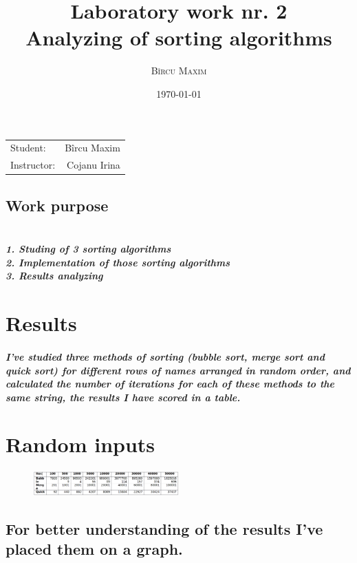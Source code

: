 \documentclass[12pt]{article}
\title{Laboratory work nr. 2  \\Analyzing of sorting algorithms\\ } %
\author{\textsc{Bîrcu} \textsc{Maxim}} %
\date{\today} %
\begin{document}
\maketitle %

\begin{center}
\begin{tabular}{l r}

Student: & Bîrcu Maxim \\ %
Instructor: & Cojanu Irina %

\end{tabular}
\end{center}


\subsection*{Work purpose}
\subparagraph*{
\\1. Studing of 3 sorting algorithms \\
2. Implementation of those sorting algorithms\\
3. Results analyzing }

\newpage
\section*{Results}

\subparagraph*{I've studied three methods of sorting (bubble sort, merge sort and quick sort) for different rows of names arranged in random order, and calculated the number of iterations for each of these methods to the same string, the results I have scored in a table.
}

\section{Random inputs}

\begin{figure}[h!]
  \centering
    {%
      \includegraphics[width=0.5\textwidth]{1}}
\end{figure}

\subsection*{
For better understanding of the results I've placed them on a graph.
}
\end{document}
